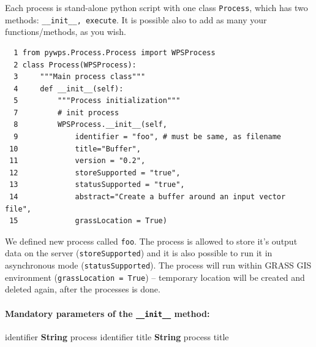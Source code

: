 \documentclass[a4paper,11pt]{report}
\begin{document}
Each process is stand-alone python script with one class \texttt{Process},
which has two methods: \texttt{\_\_init\_\_, execute}. It is possible also to add as 
many your functions/methods, as you wish.
    

\begin{verbatim}
  1 from pywps.Process.Process import WPSProcess                                
  2 class Process(WPSProcess):
  3     """Main process class"""
  4     def __init__(self):
  5         """Process initialization"""
  7         # init process
  8         WPSProcess.__init__(self,
  9             identifier = "foo", # must be same, as filename
 10             title="Buffer",
 11             version = "0.2",
 12             storeSupported = "true",
 13             statusSupported = "true",
 14             abstract="Create a buffer around an input vector file",
 15             grassLocation = True)
\end{verbatim}

We defined new process called \texttt{foo}. The process is allowed to
store it's output data on the server (\texttt{storeSupported}) and it is also possible to run it in
asynchronous mode (\texttt{statusSupported}). The process will run within
GRASS GIS environment (\texttt{grassLocation = True}) -- temporary location
will be created and deleted again, after the processes is done.


\paragraph{Mandatory parameters of the \texttt{\_\_init\_\_} method:}
\begin{itemize}
        identifier \textbf{String} process identifier
        title \textbf{String} process title
\end{itemize}
\end{document}
